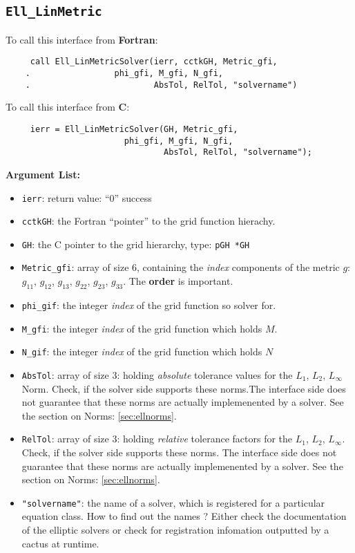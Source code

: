 \documentclass{article}
\begin{document}
\subsection{{\tt Ell\_LinMetric}}
To call this interface from {\bf Fortran}:
\begin{verbatim}
	 call Ell_LinMetricSolver(ierr, cctkGH, Metric_gfi, 
	.	 	          phi_gfi, M_gfi, N_gfi,
	.                         AbsTol, RelTol, "solvername") 
\end{verbatim}
To call this interface from {\bf C}:
\begin{verbatim}
	 ierr = Ell_LinMetricSolver(GH, Metric_gfi, 
		 	            phi_gfi, M_gfi, N_gfi,
	                            AbsTol, RelTol, "solvername");
\end{verbatim}
{\bf Argument List:}
\begin{itemize}
\item{\tt ierr}: return value: ``0'' success
\item{\tt cctkGH}: the Fortran ``pointer'' to the grid function
hierachy.
\item{\tt GH}: the C pointer to the grid hierarchy, type: {\tt pGH
*GH}
\item{\tt Metric\_gfi}: array of size $6$, containing the {\em index} components of 
the metric $g$: $g_{11}$, $g_{12}$, $g_{13}$, $g_{22}$, $g_{23}$,
$g_{33}$. The {\bf order} is important.
\item{\tt phi\_gif}: the integer {\em index} of the grid function so solver
for.
\item{\tt M\_gfi}:  the integer {\em index} of the grid function which holds
$M$.
\item{\tt N\_gif}: the integer {\em index} of the grid function which holds $N$
\item{\tt AbsTol}: array of size $3$: holding {\em absolute} tolerance values for the 
$L_1$, $L_2$, $L_\infty$ Norm.  Check, if the solver side supports
these norms.The interface side does not guarantee that these norms are 
actually implemenented by a solver. See the section on Norms: \ref{sec:ellnorms}.
\item{\tt RelTol}: array of size $3$: holding {\em relative}
tolerance factors for the $L_1$, $L_2$, $L_\infty$. Check, if the 
solver side supports these norms. The interface side does not
guarantee that these norms are actually implemenented by a solver. 
See the section on Norms: \ref{sec:ellnorms}.
\item{\tt  "solvername"}: the name of a solver, which is registered
for a particular equation class. How to find out the names ? Either
check the documentation of the elliptic solvers or check for
registration infomation outputted by a cactus at runtime.
\end{itemize}
\end{document}
